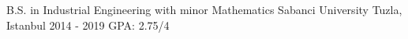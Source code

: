 

\begin{cventries}

  \cventry
    {B.S. in Industrial Engineering with minor Mathematics} %
    {Sabanci University} %
    {Tuzla, Istanbul} %
    {2014 - 2019} %
    {GPA: 2.75/4}
    {
    }
\vspace{-0.7cm}
\newline
\end{cventries}